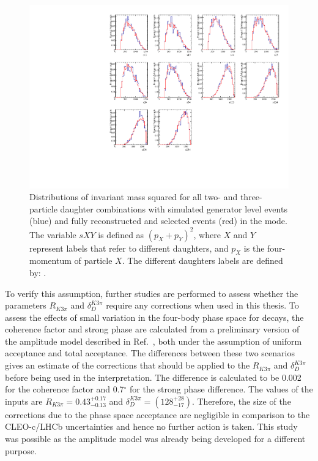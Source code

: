 \begin{figure}[h]
\centering
\includegraphics[width=0.9\linewidth]{figures/results/dalitzDist_PiPiPiPi.pdf}
\caption{Distributions of invariant mass squared for all two- and three-particle \Dz daughter combinations with simulated generator level events (blue) and fully reconstructed and selected events (red) in the \pipipipi mode. The variable $sXY$ is defined as $(p_X + p_Y)^2$, where $X$ and $Y$ represent labels that refer to different \Dz daughters, and $p_X$ is the four-momentum of particle $X$. The different \Dz daughters labels are defined by: .}
\label{dalitz4pi}
\end{figure}

To verify this assumption, further studies are performed to assess whether the parameters $R_{K3\pi}$ and $\delta_D^{K3\pi}$ require any corrections when used in this thesis. To assess the effects of small variation in the four-body phase space for \kpipipi decays, the coherence factor and strong phase are calculated from a preliminary version of the \decay{\Dz}{\Km\pip\pim\pip} amplitude model described in Ref.~\cite{LHCb-PAPER-2017-040}, both under the assumption of uniform acceptance and total \lhcb acceptance. The differences between these two scenarios gives an estimate of the corrections that should be applied to the $R_{K3\pi}$ and $\delta_D^{K3\pi}$ before being used in the \lhcb interpretation. The difference is calculated to be 0.002 for the coherence factor and 0.7$^{\circ}$ for the strong phase difference. The values of the inputs are $R_{K3\pi} = 0.43^{+0.17}_{-0.13}$ and $\delta_D^{K3\pi} = \left(128^{+28}_{-17}\right)$. Therefore, the size of the corrections due to the \lhcb phase space acceptance are negligible in comparison to the CLEO-c/LHCb uncertainties and hence no further action is taken. This study was possible as the \decay{\Dz}{\Km\pip\pim\pip} amplitude model was already being developed for a different purpose.

